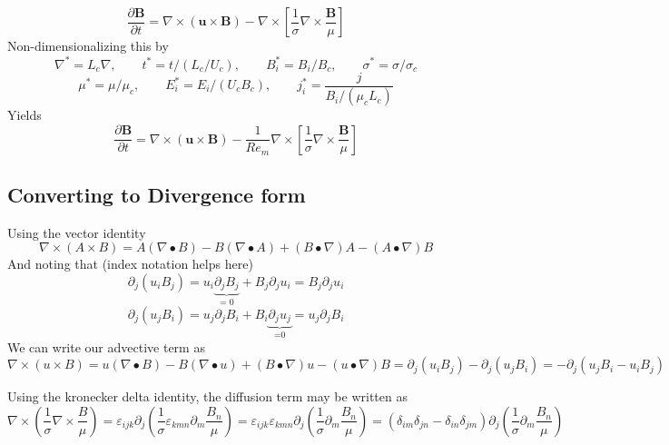 \documentclass[11pt]{article}
\begin{document}
\begin{equation}
\frac{\partial \pmb{B}}{\partial t} = 
\nabla \times (\pmb{u} \times \pmb{B})
- \nabla \times 
\left[ \frac{1}{\sigma}
\nabla \times \frac{\pmb{B}}{\mu} \right]
\end{equation}
Non-dimensionalizing this by
\begin{equation*}
\nabla^* = L_c \nabla ,\qquad
t^* = t/(L_c/U_c) ,\qquad
B_i^* = B_i/B_c  ,\qquad
\sigma^* = \sigma/\sigma_c
\end{equation*}
\begin{equation*}
\mu^* = \mu/\mu_c ,\qquad
E_i^* = E_i/(U_c B_c) ,\qquad
j_i^* = \frac{j}{B_i/(\mu_c L_c)}
\end{equation*}
Yields
\begin{equation}
\boxed{
\frac{\partial \pmb{B}}{\partial t} = 
\nabla \times (\pmb{u} \times \pmb{B})
- 
\frac{1}{Re_m}
\nabla \times 
\left[ \frac{1}{\sigma}
\nabla \times \frac{\pmb{B}}{\mu} \right]
}
\end{equation}

\subsection{Converting to Divergence form}

Using the vector identity
\begin{equation}
\nabla \times (A\times B) = 
A(\nabla \bullet B) 
- B(\nabla \bullet A)
+(B \bullet \nabla)A - (A \bullet \nabla)B
\end{equation}
And noting that (index notation helps here)
\begin{equation}
\partial_j (u_i B_j) = 
u_i \underbrace{\partial_j B_j}_\text{= 0} + B_j \partial_j u_i
= B_j \partial_j u_i
\end{equation}
\begin{equation}
\partial_j (u_j B_i) = 
u_j \partial_j B_i + B_i \underbrace{\partial_j u_j}_\text{=0}
= u_j \partial_j B_i
\end{equation}
We can write our advective term as
\begin{equation}
\nabla \times (u \times B) 
= u(\nabla \bullet B) 
- B(\nabla \bullet u)
+ (B \bullet \nabla)u
- (u \bullet \nabla)B
=
\partial_j (u_i B_j) - \partial_j (u_j B_i)
=
-\partial_j (u_j B_i - u_i B_j)
\end{equation}

Using the kronecker delta identity, the diffusion term may be written as
\begin{equation}
\nabla \times \left( \frac{1}{\sigma} \nabla \times \frac{B}{\mu} \right)
 = \varepsilon_{ijk} \partial_j \left( \frac{1}{\sigma} \varepsilon_{kmn} \partial_m \frac{B_n}{\mu} \right)
  = \varepsilon_{ijk} \varepsilon_{kmn} \partial_j \left( \frac{1}{\sigma} \partial_m \frac{B_n}{\mu} \right)
  = (\delta_{im}\delta_{jn} - \delta_{in}\delta_{jm}) \partial_j \left( \frac{1}{\sigma} \partial_m \frac{B_n}{\mu} \right)
\end{equation}
\end{document}
